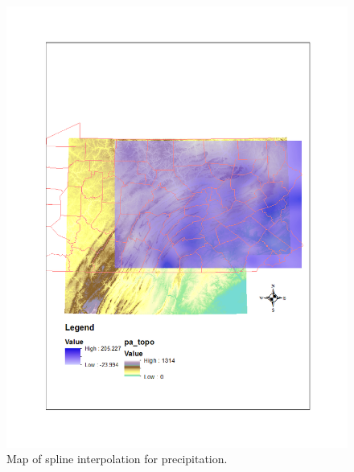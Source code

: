 \documentclass{article}\usepackage[]{graphicx}\usepackage[]{color}
\begin{document}
\begin{figure}
\includegraphics[scale=.9]{./figure/Spline_pcp}
\caption{Map of spline interpolation for precipitation.}
\label{spcp}
\end{figure}
\end{document}
